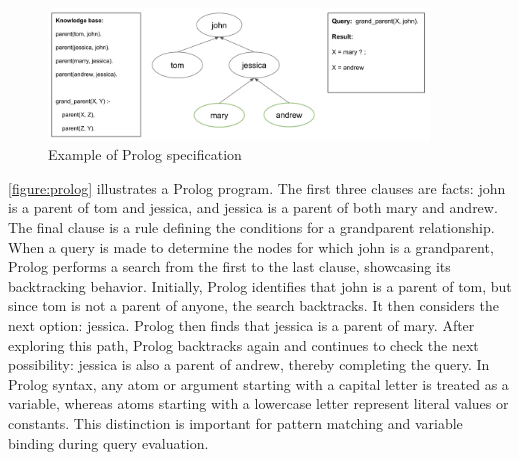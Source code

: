 \begin{figure}[h]
    \centering
    \includegraphics[width=0.9\textwidth]{Packages/Prolog.png}
    \caption{Example of Prolog specification}
    \label{figure:prolog}
\end{figure}

\autoref{figure:prolog} illustrates a Prolog program. The first three clauses are facts: john is a parent of tom and jessica, and jessica is a parent of both mary and andrew. The final clause is a rule defining the conditions for a grandparent relationship. When a query is made to determine the nodes for which john is a grandparent, Prolog performs a search from the first to the last clause, showcasing its backtracking behavior. Initially, Prolog identifies that john is a parent of tom, but since tom is not a parent of anyone, the search backtracks. It then considers the next option: jessica. Prolog then finds that jessica is a parent of mary. After exploring this path, Prolog backtracks again and continues to check the next possibility: jessica is also a parent of andrew, thereby completing the query.
In Prolog syntax, any atom or argument starting with a capital letter is treated as a variable, whereas atoms starting with a lowercase letter represent literal values or constants. This distinction is important for pattern matching and variable binding during query evaluation.
